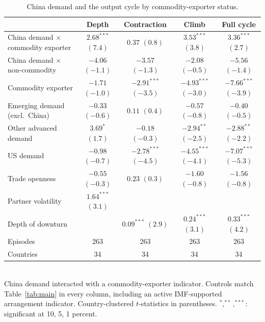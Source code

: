 \begin{table}[t]
\centering
\small
\caption{China demand and the output cycle by commodity-exporter status.}
\label{tab:china}
\begin{tabular}{lcccc}
\toprule
 & Depth & Contraction & Climb & Full cycle \\
\midrule
China demand $\times$ commodity exporter & $2.68^{***}$ {\scriptsize$(7.4)$} & $0.37$ {\scriptsize$(0.8)$} & $3.53^{***}$ {\scriptsize$(3.8)$} & $3.36^{***}$ {\scriptsize$(2.7)$} \\
China demand $\times$ non-commodity & $-4.06$ {\scriptsize$(-1.1)$} & $-3.57$ {\scriptsize$(-1.3)$} & $-2.08$ {\scriptsize$(-0.5)$} & $-5.56$ {\scriptsize$(-1.4)$} \\
Commodity exporter & $-1.71$ {\scriptsize$(-1.0)$} & $-2.91^{***}$ {\scriptsize$(-3.5)$} & $-4.93^{***}$ {\scriptsize$(-3.0)$} & $-7.66^{***}$ {\scriptsize$(-3.9)$} \\
Emerging demand (excl.\ China) & $-0.33$ {\scriptsize$(-0.6)$} & $0.11$ {\scriptsize$(0.4)$} & $-0.57$ {\scriptsize$(-0.8)$} & $-0.40$ {\scriptsize$(-0.5)$} \\
Other advanced demand & $3.69^{*}$ {\scriptsize$(1.7)$} & $-0.18$ {\scriptsize$(-0.3)$} & $-2.94^{**}$ {\scriptsize$(-2.5)$} & $-2.88^{**}$ {\scriptsize$(-2.2)$} \\
US demand & $-0.98$ {\scriptsize$(-0.7)$} & $-2.78^{***}$ {\scriptsize$(-4.5)$} & $-4.55^{***}$ {\scriptsize$(-4.1)$} & $-7.07^{***}$ {\scriptsize$(-5.3)$} \\
Trade openness & $-0.55$ {\scriptsize$(-0.3)$} & $0.23$ {\scriptsize$(0.3)$} & $-1.60$ {\scriptsize$(-0.8)$} & $-1.56$ {\scriptsize$(-0.8)$} \\
Partner volatility & $1.64^{***}$ {\scriptsize$(3.1)$} &  &  &  \\
Depth of downturn &  & $0.09^{***}$ {\scriptsize$(2.9)$} & $0.24^{***}$ {\scriptsize$(3.1)$} & $0.33^{***}$ {\scriptsize$(4.2)$} \\
\midrule
Episodes & 263 & 263 & 263 & 263 \\
Countries & 34 & 34 & 34 & 34 \\
\bottomrule\end{tabular}
\\[2pt]\footnotesize{China demand interacted with a commodity-exporter indicator. Controls match Table~\ref{tab:main} in every column, including an active IMF-supported arrangement indicator. Country-clustered $t$-statistics in parentheses. $^{*},^{**},^{***}$: significant at 10, 5, 1 percent.}
\end{table}

